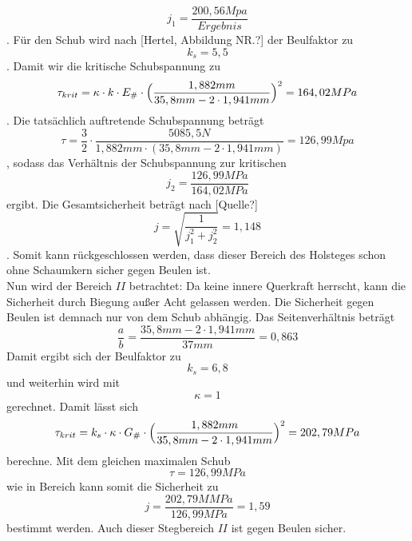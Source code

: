 \begin{equation}
	j_{1}=\frac{200,56 Mpa}{Ergebnis}
\end{equation}. Für den Schub wird nach [Hertel, Abbildung NR.?] der Beulfaktor zu
\begin{equation}
	k_{s}=5,5
\end{equation}
. Damit wir die kritische Schubspannung zu 
\begin{equation}
	\tau_{krit}=\kappa\cdot k\cdot E_{\#}\cdot\Bigl(\frac{1,88 2mm}{35,8 mm - 2\cdot 1,941  mm}\Bigr)^{2}=164,02 MPa
\end{equation}
. Die tatsächlich auftretende Schubspannung beträgt 
\begin{equation}
	\tau=\frac{3}{2}\cdot \frac{5085,5 N}{1,882 mm\cdot(35,8 mm-2\cdot 1,941 mm)}=126,99 Mpa
\end{equation}
, sodass das Verhältnis der Schubspannung zur kritischen 
\begin{equation}
	j_{2}=\frac{126,99 MPa}{164,02 MPa}
\end{equation}
ergibt. Die Gesamtsicherheit beträgt nach [Quelle?]
\begin{equation}
	j=\sqrt{\frac{1}{j_{1}^{2}+j_{2}^{2}}}=1,148
\end{equation}
. Somit kann rückgeschlossen werden, dass dieser Bereich des Holsteges schon ohne Schaumkern sicher gegen Beulen ist.\\

\noindent Nun wird der Bereich $II$ betrachtet:
Da keine innere Querkraft herrscht, kann die Sicherheit durch Biegung außer Acht gelassen werden. Die Sicherheit gegen Beulen ist demnach nur von dem Schub abhängig.
Das Seitenverhältnis beträgt 
\begin{equation}
	\frac{a}{b}=\frac{35,8mm - 2\cdot 1,941mm}{37mm}=0,863
\end{equation}
Damit ergibt sich der Beulfaktor zu 
\begin{equation}
	k_{s}=6,8
\end{equation}
und weiterhin wird mit 
\begin{equation}
	\kappa = 1 
\end{equation}
gerechnet. Damit lässt sich 
\begin{equation}
	 \tau_{krit} = k_{s}\cdot \kappa\cdot G_{\#}\cdot \Bigl(\frac{1,882mm}{35,8mm-2\cdot 1,941mm}\Bigr)^{2}= 202,79 MPa
\end{equation}
berechne. Mit dem gleichen maximalen Schub
\begin{equation}
	\tau=126,99 MPa
\end{equation}
 wie in Bereich kann somit die Sicherheit zu 
 \begin{equation}
 	j=\frac{202,79M MPa}{126,99 MPa}=1,59
 \end{equation}
bestimmt werden. Auch dieser Stegbereich $II$ ist gegen Beulen sicher.\\

